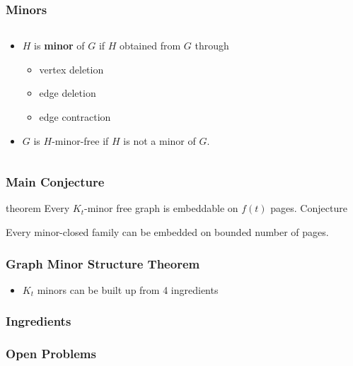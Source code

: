 \documentclass{beamer}
\newenvironment{conjecture}{theorem}{Conjecture}
\begin{document}
\begin{frame}
    \frametitle{Minors}
    \begin{columns}
      \begin{column}{0.5\textwidth}
          \begin{itemize}
            \item $H$ is \textbf{minor} of $G$ if $H$ obtained from $G$ through \begin{itemize}
              \item vertex deletion
              \item edge deletion
              \item edge contraction
            \end{itemize}
            \item $G$ is $H$-minor-free if $H$ is not a minor of $G$. 
          \end{itemize}    
      \end{column}
        \begin{column}{0.5\textwidth}
          \begin{figure}
            \centering
            
          \end{figure}
      \end{column}
    \end{columns}
\end{frame}

\begin{frame}
	\frametitle{Main Conjecture}
		\begin{conjecture}
		Every $K_t$-minor free graph is embeddable on $f(t)$ pages.
	\end{conjecture}
	
	\begin{corollary}
		Every minor-closed family can be embedded on bounded number of pages.
	\end{corollary}
\end{frame}

\begin{frame}
    \frametitle{Graph Minor Structure Theorem}
    \begin{itemize}
      \item $K_t$ minors can be built up from 4 ingredients
    \end{itemize}
\end{frame}

\begin{frame}
  \frametitle{Ingredients}
\end{frame}

\begin{frame}
  \frametitle{Open Problems}
\end{frame}
\end{document}
